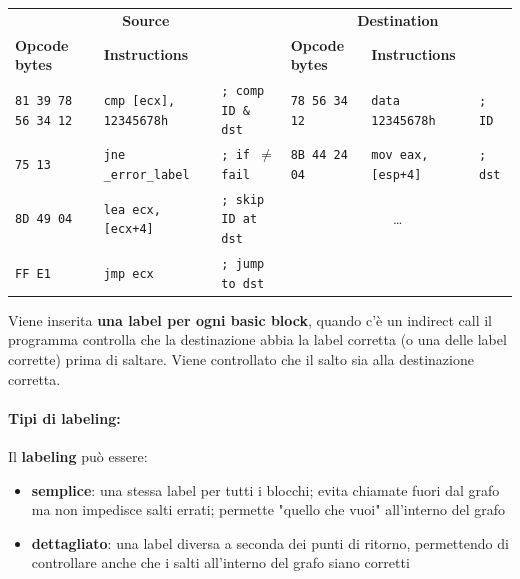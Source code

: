 \begin{table}[h]
	\centering
	\begin{adjustbox}{max width=\textwidth}
	\begin{tabular}{@{} lll | lll @{}}
		\multicolumn{3}{c}{\bfseries Source} & \multicolumn{3}{c}{\bfseries Destination} \\
		\cmidrule(lr){1-3} \cmidrule(l){4-6}
		\bfseries Opcode bytes & \bfseries Instructions &
		& \bfseries Opcode bytes & \bfseries Instructions &\\
		\midrule
		\texttt{81 39 78 56 34 12}
		& \texttt{cmp [ecx],\,12345678h} & \texttt{; comp ID \& dst}
		& \texttt{78 56 34 12} & \texttt{data 12345678h} & \texttt{; ID} \\
		\texttt{75 13}
		& \texttt{jne \_error\_label} & \texttt{; if \(\neq\) fail}
		& \texttt{8B 44 24 04} & \texttt{mov eax, [esp+4]} & \texttt{; dst} \\
		\texttt{8D 49 04}
		& \texttt{lea ecx,[ecx+4]} & \texttt{; skip ID at dst}
		& \multicolumn{3}{c}{\dots} \\
		\texttt{FF E1}
		& \texttt{jmp ecx} & \texttt{; jump to dst}
		& & & \\
	\end{tabular}
	\end{adjustbox}
\end{table}

Viene inserita \textbf{una label per ogni basic block}, quando c'è un indirect call il programma controlla che la destinazione abbia la label corretta (o una delle label corrette) prima di saltare. Viene controllato che il salto sia alla destinazione corretta.

\paragraph{Tipi di labeling:} Il \textbf{labeling} può essere: 
\begin{itemize}
	\item \textbf{semplice}: una stessa label per tutti i blocchi; evita chiamate fuori dal grafo ma non impedisce salti errati; permette "quello che vuoi" all'interno del grafo
    
	\item \textbf{dettagliato}: una label diversa a seconda dei punti di ritorno, permettendo di controllare anche che i salti all'interno del grafo siano corretti
\end{itemize}


